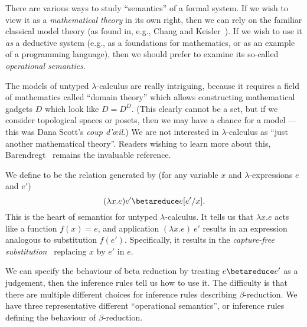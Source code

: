 \begin{node}[Semantics]\label{untyped-lambda-000C}%

\begin{node}\label{untyped-lambda-000D}%
There are various ways to study ``semantics'' of a formal system. If we
wish to view it as a \emph{mathematical theory} in its own right, then
we can rely on the familiar classical model theory (as found in, e.g.,
Chang and Keisler~\cite{chang2012model}). If we wish to use it \emph{as}
a deductive system (e.g., as a foundations for mathematics, or as an
example of a programming language), then we should prefer to examine its
so-called \emph{operational semantics}.

The models of untyped $\lambda$-calculus are really intriguing, because
it requires a field of mathematics called ``domain theory'' which allows
constructing mathematical gadgets $D$ which look like $D=D^{D}$. (This
clearly cannot be a set, but if we consider topological spaces or
posets, then we may have a chance for a model --- this was Dana Scott's
\textit{coup d'\oe{}il}.)
We are not interested in $\lambda$-calculus as ``just another mathematical theory''.
Readers wishing to learn more about this, Barendregt~\cite{barendregt2012lambda}
remains the invaluable reference.
\end{node}

\begin{definition}\label{untyped-lambda-000I}%
We define  to be the relation generated by (for
any variable $x$ and $\lambda$-expressions $e$ and $e'$)
\[(\lambda x.e)e'\betareduce e[e'/x]. \]
This is the heart of semantics for untyped $\lambda$-calculus. It tells
us that $\lambda x.e$ acts like a function $f(x)=e$, and application
$(\lambda x.e)~e'$ results in an expression analogous to substitution $f(e')$.
Specifically, it results in the \emph{capture-free substitution}~
replacing $x$ by $e'$ in $e$.
\end{definition}

\begin{node}\label{untyped-lambda-000J}%
We can specify the behaviour of beta reduction by treating $e\betareduce e'$
as a judgement, then the inference rules tell us how to use it. The
difficulty is that there are multiple different choices for inference
rules describing $\beta$-reduction. We have three representative
different ``operational semantics'', or inference rules defining the
behaviour of $\beta$-reduction.


\end{node}
\end{node}
